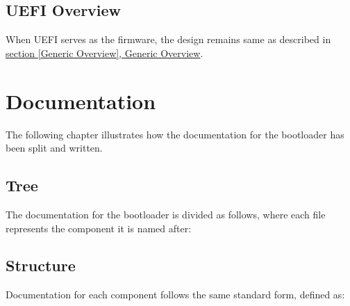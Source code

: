 \documentclass[11pt,a4paper,oneside]{report}
\begin{document}
\section{UEFI Overview}

When UEFI serves as the firmware, the design remains same as described in \hyperref[Generic Overview]{section \ref*{Generic Overview}, Generic Overview}.

\chapter{Documentation}

The following chapter illustrates how the documentation for the bootloader has been split and written.

\section{Tree}

The documentation for the bootloader is divided as follows, where each file represents the component it is named after:\\


\section{Structure}

Documentation for each component follows the same standard form, defined as:
\end{document}

